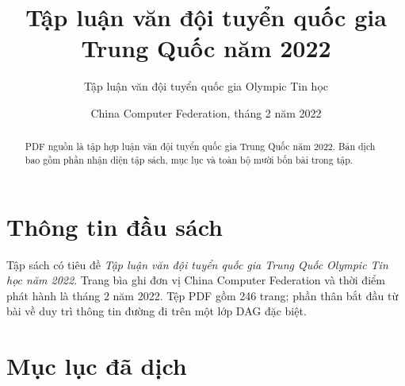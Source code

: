 \documentclass[11pt]{article}
\title{Tập luận văn đội tuyển quốc gia Trung Quốc năm 2022}
\author{Tập luận văn đội tuyển quốc gia Olympic Tin học}
\date{China Computer Federation, tháng 2 năm 2022}
\begin{document}
\maketitle


\renewcommand{\abstractname}{Tóm tắt}
\begin{abstract}
PDF nguồn là tập hợp luận văn đội tuyển quốc gia Trung Quốc năm 2022. Bản dịch
bao gồm phần nhận diện tập sách, mục lục và toàn bộ mười bốn bài trong tập.
\end{abstract}

\section{Thông tin đầu sách}

Tập sách có tiêu đề \emph{Tập luận văn đội tuyển quốc gia Trung Quốc Olympic
Tin học năm 2022}. Trang bìa ghi đơn vị China Computer Federation và thời điểm
phát hành là tháng 2 năm 2022. Tệp PDF gồm 246 trang; phần thân bắt đầu từ bài
về duy trì thông tin đường đi trên một lớp DAG đặc biệt.

\section{Mục lục đã dịch}
\end{document}

